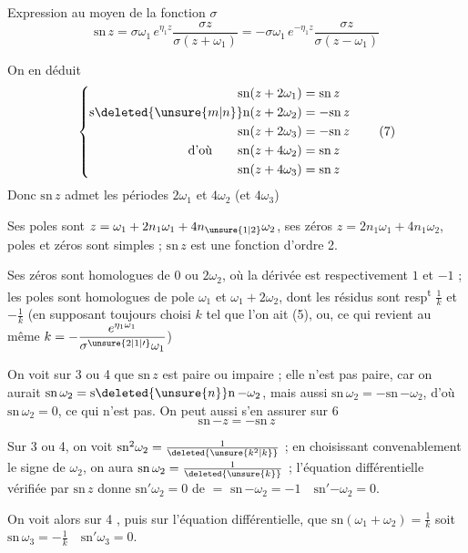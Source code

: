 Expression au moyen de la fonction $\sigma$
\[
\boxed{\mathrm{sn}\,z=\sigma\omega_1\,e^{\eta_1 z}\frac{\sigma z}{\sigma(z+\omega_1)}
=-\sigma\omega_1\,e^{-\eta_1 z}\frac{\sigma z}{\sigma(z-\omega_1)}} \tag*{(6)}
\]

 

On en déduit
\[
\left\{\begin{aligned}
\mathrm{sn}(z+2\omega_1)&=\mathrm{sn}\,z\\
\mathrm{s}\deleted{\unsure{m|n}}\mathrm{n}(z+2\omega_2)&=-\mathrm{sn}\,z\\
\mathrm{sn}(z+2\omega_3)&=-\mathrm{sn}\,z\\
\text{d'où}\qquad\mathrm{sn}(z+4\omega_2)&=\mathrm{sn}\,z\\
\mathrm{sn}(z+4\omega_3)&=\mathrm{sn}\,z
\end{aligned}\right. \tag*{(7)}
\]
Donc $\mathrm{sn}\,z$ admet les périodes $2\omega_1$ et $4\omega_2$ (et $4\omega_3$)

Ses poles sont $z=\omega_1+2n_1\omega_1+4n_{\unsure{1|2}}\omega_2$, ses zéros $z=2n_1\omega_1+4n_1\omega_2$, poles et zéros sont simples ; $\mathrm{sn}\,z$ est une fonction d'ordre 2.

Ses zéros sont homologues de $0$ ou $2\omega_{2}$, où la dérivée est respectivement $1$ et $-1$ ; les poles sont homologues de pole $\omega_1$ et $\omega_1+2\omega_2$, dont les résidus sont resp\textsuperscript{t} $\frac{1}{k}$ et $-\frac{1}{k}$ (en supposant toujours choisi  $k$ tel que l'on ait (5), ou, ce qui revient au même $\displaystyle k=-\frac{e^{\eta_1\omega_1}}{\sigma^{\unsure{2|1|\prime}}\omega_1}$)

On voit sur 3 ou 4 que $\mathrm{sn}\,z$ est paire ou impaire ; elle n'est pas paire, car on aurait $\mathrm{sn}\,\omega_2=\mathrm{s}\deleted{\unsure{n}}\mathrm{n}\,{-\omega_2}$, mais aussi $\mathrm{sn}\,\omega_2=-\mathrm{sn}\,{-\omega_2}$, d'où $\mathrm{sn}\,\omega_2=0$, ce qui n'est pas. On peut aussi s'en assurer sur 6
\[
\boxed{\mathrm{sn}\,{-z}=-\mathrm{sn}\,z}
\]

Sur 3 ou 4, on voit $\mathrm{sn}^2\omega_2=\frac{1}{\deleted{\unsure{k^2|k}}}$ ; en choisissant convenablement le signe de $\omega_2$, on aura \uline{$\mathrm{sn}\,\omega_2=\frac{1}{\deleted{\unsure{k}}}$} ; l'équation différentielle vérifiée par $\mathrm{sn}\,z$ donne \uline{$\mathrm{sn}'\omega_2=0$} de $=$ $\mathrm{sn}\,{-\omega_2}=-1\quad\mathrm{sn}'{-\omega_2}=0$.

On voit alors sur 4 , puis sur l'équation différentielle, que $\mathrm{sn}(\omega_1+\omega_2)=\frac1k$ soit \uline{$\mathrm{sn}\,\omega_3=-\frac1k\quad\mathrm{sn}'\omega_3=0$}.

